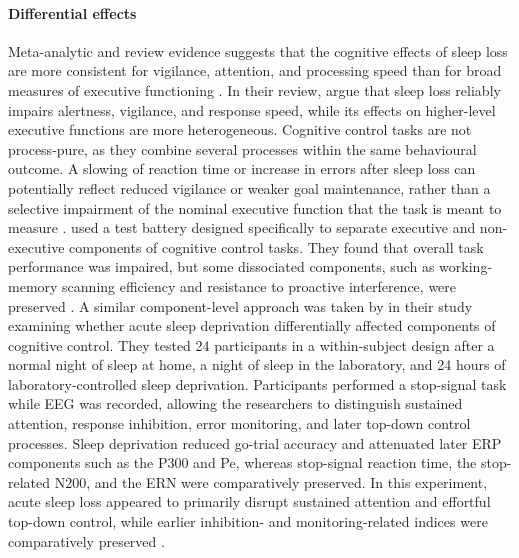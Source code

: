 \documentclass[12pt,a4paper]{report}
\begin{document}
\paragraph{Differential effects}
Meta-analytic and review evidence suggests that the cognitive effects of sleep loss are more consistent for vigilance, attention, and processing speed than for broad measures of executive functioning \parencite{lim2010meta,lowe2017meta,killgore2010sleepcognition}. In their review, \textcite{killgore2010sleepcognition} argue that sleep loss reliably impairs alertness, vigilance, and response speed, while its effects on higher-level executive functions are more heterogeneous. Cognitive control tasks are not process-pure, as they combine several processes within the same behavioural outcome. A slowing of reaction time or increase in errors after sleep loss can potentially reflect reduced vigilance or weaker goal maintenance, rather than a selective impairment of the nominal executive function that the task is meant to measure \parencite{killgore2010sleepcognition,kusztor2019differentialsleep,tucker2010sleepdeprivation}. \textcite{tucker2010sleepdeprivation} used a test battery designed specifically to separate executive and non-executive components of cognitive control tasks. They found that overall task performance was impaired, but some dissociated components, such as working-memory scanning efficiency and resistance to proactive interference, were preserved \parencite{tucker2010sleepdeprivation}. A similar component-level approach was taken by \textcite{kusztor2019differentialsleep} in their study examining whether acute sleep deprivation differentially affected components of cognitive control. They tested 24 participants in a within-subject design after a normal night of sleep at home, a night of sleep in the laboratory, and 24 hours of laboratory-controlled sleep deprivation. Participants performed a stop-signal task while EEG was recorded, allowing the researchers to distinguish sustained attention, response inhibition, error monitoring, and later top-down control processes. Sleep deprivation reduced go-trial accuracy and attenuated later ERP components such as the P300 and Pe, whereas stop-signal reaction time, the stop-related N200, and the ERN were comparatively preserved. In this experiment, acute sleep loss appeared to primarily disrupt sustained attention and effortful top-down control, while earlier inhibition- and monitoring-related indices were comparatively preserved \parencite{kusztor2019differentialsleep}.
\end{document}
